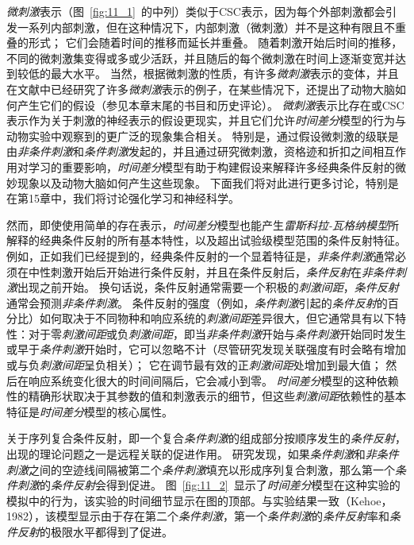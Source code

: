 \textit{微刺激}表示（图~\ref{fig:11_1}~的中列）类似于CSC表示，因为每个外部刺激都会引发一系列内部刺激，但在这种情况下，内部刺激（微刺激）并不是这种有限且不重叠的形式；
它们会随着时间的推移而延长并重叠。
随着刺激开始后时间的推移，不同的微刺激集变得或多或少活跃，并且随后的每个微刺激在时间上逐渐变宽并达到较低的最大水平。
当然，根据微刺激的性质，有许多\textit{微刺激}表示的变体，并且在文献中已经研究了许多\textit{微刺激}表示的例子，在某些情况下，还提出了动物大脑如何产生它们的假设（参见本章末尾的书目和历史评论）。
\textit{微刺激}表示比存在或CSC表示作为关于刺激的神经表示的假设更现实，并且它们允许\textit{时间差分}模型的行为与动物实验中观察到的更广泛的现象集合相关。
特别是，通过假设微刺激的级联是由\textit{非条件刺激}和\textit{条件刺激}发起的，并且通过研究微刺激，资格迹和折扣之间相互作用对学习的重要影响，\textit{时间差分}模型有助于构建假设来解释许多经典条件反射的微妙现象以及动物大脑如何产生这些现象。
下面我们将对此进行更多讨论，特别是在第15章中，我们将讨论强化学习和神经科学。


然而，即使使用简单的存在表示，\textit{时间差分}模型也能产生\textit{雷斯科拉-瓦格纳模型}所解释的经典条件反射的所有基本特性，以及超出试验级模型范围的条件反射特征。
例如，正如我们已经提到的，经典条件反射的一个显着特征是，\textit{非条件刺激}通常必须在中性刺激开始后开始进行条件反射，并且在条件反射后，\textit{条件反射}在\textit{非条件刺激}出现之前开始。
换句话说，条件反射通常需要一个积极的\textit{刺激间距}，\textit{条件反射}通常会预测\textit{非条件刺激}。
条件反射的强度（例如，\textit{条件刺激}引起的\textit{条件反射}的百分比）如何取决于不同物种和响应系统的\textit{刺激间距}差异很大，但它通常具有以下特性：对于零\textit{刺激间距}或负\textit{刺激间距}，即当\textit{非条件刺激}开始与\textit{条件刺激}开始同时发生或早于\textit{条件刺激}开始时，它可以忽略不计（尽管研究发现关联强度有时会略有增加或与负\textit{刺激间距}呈负相关）；
它在调节最有效的正\textit{刺激间距}处增加到最大值；
然后在响应系统变化很大的时间间隔后，它会减小到零。
\textit{时间差分}模型的这种依赖性的精确形状取决于其参数的值和刺激表示的细节，但这些\textit{刺激间距}依赖性的基本特征是\textit{时间差分}模型的核心属性。


关于序列复合条件反射，即一个复合\textit{条件刺激}的组成部分按顺序发生的\textit{条件反射}，出现的理论问题之一是远程关联的促进作用。
研究发现，如果\textit{条件刺激}和\textit{非条件刺激}之间的空迹线间隔被第二个\textit{条件刺激}填充以形成序列复合刺激，那么第一个\textit{条件刺激}的\textit{条件反射}会得到促进。
图~\ref{fig:11_2}~显示了\textit{时间差分}模型在这种实验的模拟中的行为，该实验的时间细节显示在图的顶部。与实验结果一致（Kehoe，1982），该模型显示由于存在第二个\textit{条件刺激}，第一个\textit{条件刺激}的\textit{条件反射}率和\textit{条件反射}的极限水平都得到了促进。

